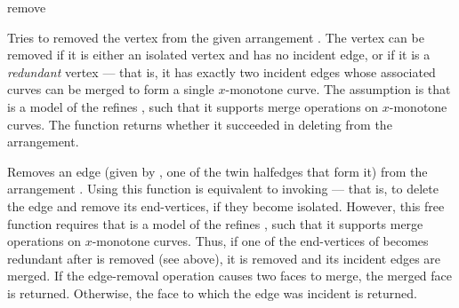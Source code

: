
\ccRefPageBegin

\begin{ccRefFunction}{remove}


   {Tries to removed the vertex  from the given arrangement .
    The vertex can be removed if it is either an isolated vertex and has no
    incident edge, or if it is a {\sl redundant} vertex --- that is, it has
    exactly two incident edges whose associated curves can be merged to form
    a single $x$-monotone curve. The assumption is that  is a
    model of the refines , such that it
    supports merge operations on $x$-monotone curves.
    The function returns whether it succeeded in deleting  from the
    arrangement.}

   {Removes an edge (given by , one of the twin halfedges that form it)
    from the arrangement . Using this function is equivalent to
    invoking  --- that is, to delete the
    edge and remove its end-vertices, if they become isolated. However, this
    free function requires that  is a model of the refines
    , such that it supports merge operations
    on $x$-monotone curves. Thus, if one of the end-vertices of  becomes
    redundant after  is removed (see above), it is removed and its
    incident edges are merged.
    If the edge-removal operation causes two faces to merge, the merged face
    is returned. Otherwise, the face to which the edge was incident is
    returned.}

\end{ccRefFunction}

\ccRefPageEnd
